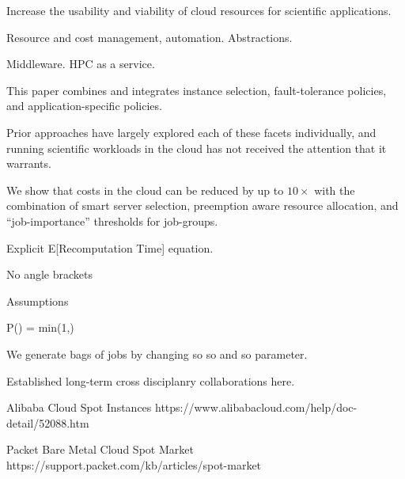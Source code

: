Increase the usability and viability of cloud resources for scientific applications.

Resource and cost management, automation. Abstractions. 

Middleware. HPC as a service.


This paper combines and integrates instance selection, fault-tolerance policies, and application-specific policies.

Prior approaches have largely explored each of these facets individually, and running scientific workloads in the cloud has not received the attention that it warrants.

We show that costs in the cloud can be reduced by up to $10\times$ with the combination of smart server selection, preemption aware resource allocation, and ``job-importance'' thresholds for job-groups.

Explicit E[Recomputation Time] equation. 


No angle brackets

Assumptions

P() = min(1,)

We generate bags of jobs by changing so so and so parameter.

Established long-term cross disciplanry collaborations here. 

Alibaba Cloud Spot Instances 
https://www.alibabacloud.com/help/doc-detail/52088.htm

Packet Bare Metal Cloud Spot Market
https://support.packet.com/kb/articles/spot-market


